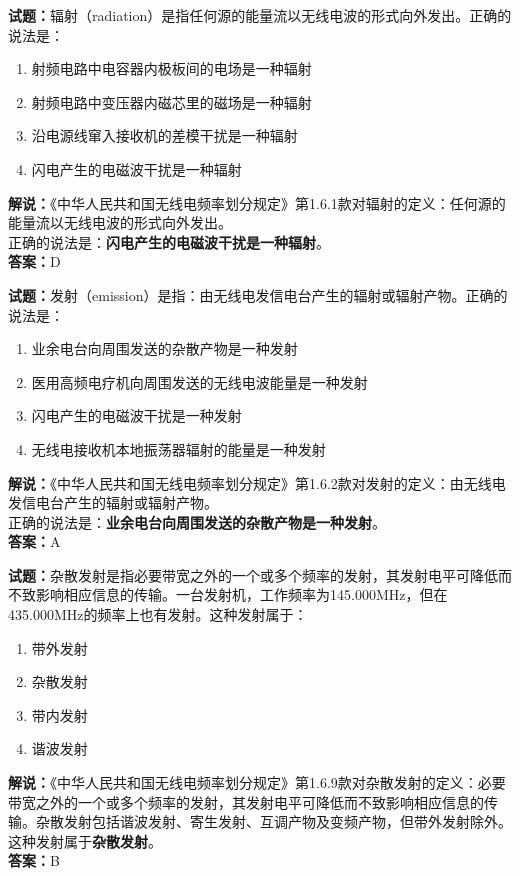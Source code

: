 \documentclass{ctexbook}
\begin{document}
\bigskip

\noindent\textbf{试题：}辐射（radiation）是指任何源的能量流以无线电波的形式向外发出。正确的说法是：
\begin{enumerate}[leftmargin=3em]
  \item 射频电路中电容器内极板间的电场是一种辐射
  \item 射频电路中变压器内磁芯里的磁场是一种辐射
  \item 沿电源线窜入接收机的差模干扰是一种辐射
  \item 闪电产生的电磁波干扰是一种辐射
\end{enumerate}
\textbf{解说：}《中华人民共和国无线电频率划分规定》第1.6.1款对辐射的定义：任何源的能量流以无线电波的形式向外发出。\\正确的说法是：\textbf{闪电产生的电磁波干扰是一种辐射}。\\\noindent\textbf{答案：}D

\bigskip

\noindent\textbf{试题：}发射（emission）是指：由无线电发信电台产生的辐射或辐射产物。正确的说法是：
\begin{enumerate}[leftmargin=3em]
  \item 业余电台向周围发送的杂散产物是一种发射
  \item 医用高频电疗机向周围发送的无线电波能量是一种发射
  \item 闪电产生的电磁波干扰是一种发射
  \item 无线电接收机本地振荡器辐射的能量是一种发射
\end{enumerate}
\noindent\textbf{解说：}《中华人民共和国无线电频率划分规定》第1.6.2款对发射的定义：由无线电发信电台产生的辐射或辐射产物。\\正确的说法是：\textbf{业余电台向周围发送的杂散产物是一种发射}。\\\noindent\textbf{答案：}A

\bigskip

\noindent\textbf{试题：}杂散发射是指必要带宽之外的一个或多个频率的发射，其发射电平可降低而不致影响相应信息的传输。一台发射机，工作频率为145.000\unit{\MHz}，但在435.000\unit{\MHz}的频率上也有发射。这种发射属于：
\begin{enumerate}[leftmargin=3em]
  \item 带外发射
  \item 杂散发射
  \item 带内发射
  \item 谐波发射
\end{enumerate}
\noindent\textbf{解说：}《中华人民共和国无线电频率划分规定》第1.6.9款对杂散发射的定义：必要带宽之外的一个或多个频率的发射，其发射电平可降低而不致影响相应信息的传
输。杂散发射包括谐波发射、寄生发射、互调产物及变频产物，但带外发射除外。\\这种发射属于\textbf{杂散发射}。\\\noindent\textbf{答案：}B
\end{document}
